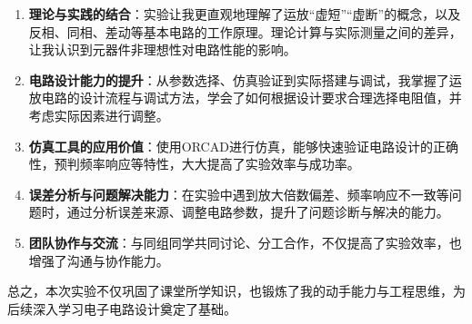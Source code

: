 \documentclass[12pt,a4paper]{article}
\begin{document}
\begin{enumerate}
    \item \textbf{理论与实践的结合}：实验让我更直观地理解了运放“虚短”“虚断”的概念，以及反相、同相、差动等基本电路的工作原理。理论计算与实际测量之间的差异，让我认识到元器件非理想性对电路性能的影响。
    \item \textbf{电路设计能力的提升}：从参数选择、仿真验证到实际搭建与调试，我掌握了运放电路的设计流程与调试方法，学会了如何根据设计要求合理选择电阻值，并考虑实际因素进行调整。
    \item \textbf{仿真工具的应用价值}：使用ORCAD进行仿真，能够快速验证电路设计的正确性，预判频率响应等特性，大大提高了实验效率与成功率。
    \item \textbf{误差分析与问题解决能力}：在实验中遇到放大倍数偏差、频率响应不一致等问题时，通过分析误差来源、调整电路参数，提升了问题诊断与解决的能力。
    \item \textbf{团队协作与交流}：与同组同学共同讨论、分工合作，不仅提高了实验效率，也增强了沟通与协作能力。
\end{enumerate}

总之，本次实验不仅巩固了课堂所学知识，也锻炼了我的动手能力与工程思维，为后续深入学习电子电路设计奠定了基础。
\end{document}
